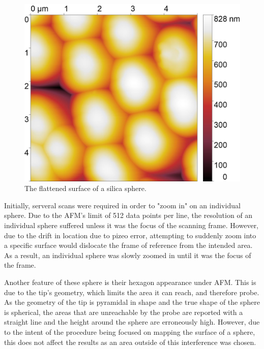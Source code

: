 \begin{figure}[h]     %
        \begin{center}
          \includegraphics[width=130mm]{chapter3/5umareat2.jpg}
\end{center}
\caption{The flattened surface of a silica sphere.}
\label{fig:Sili2}                 %
\end{figure}

Initially, serveral scans were required in order to "zoom in" on an individual sphere. Due to the AFM's limit of 512 data points per line, the resolution of an individual sphere suffered unless it was the focus of the scanning frame. However, due to the drift in location due to pizeo error, attempting to suddenly zoom into a specific surface would dislocate the frame of reference from the intended area. As a result, an individual sphere was slowly zoomed in until it was the focus of the frame.

Another feature of these sphere is their hexagon appearance under AFM. This is due to the tip's geometry, which limits the area it can reach, and therefore probe. As the geometry of the tip is pyramidal in shape and the true shape of the sphere is spherical, the areas that are unreachable by the probe are reported with a straight line and the height around the sphere are erroneously high. However, due to the intent of the procedure being focused on mapping the surface of a sphere, this does not affect the results as an area outside of this interference was chosen.

